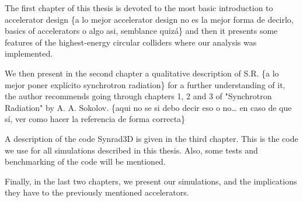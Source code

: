 The first chapter of this thesis is devoted to the most basic introduction to
accelerator design \rojo\{a lo mejor accelerator design no es la mejor forma de
decirlo, basics of accelerators o algo asi, semblance quizá\} and then it presents some features
 of the
highest-energy circular colliders where our analysis was implemented.

We then present in the second chapter a qualitative description of S.R. \rojo\{a
lo mejor poner explícito synchrotron radiation\} for a further understanding of
it, the author recommends going through chapters 1, 2 and 3 of "Synchrotron
Radiation" by A. A. Sokolov. \rojo\{aqui no se si debo decir eso o no\ldots{} en caso
de que sí, ver como hacer la referencia de forma correcta\}

A description of the code Synrad3D is given in the third chapter. This is the
code we use for all simulations described in this thesis. Also, some tests and
benchmarking of the code will be mentioned.

Finally, in the last two chapters, we present our simulations, and the
implications they have to the previously mentioned accelerators.




